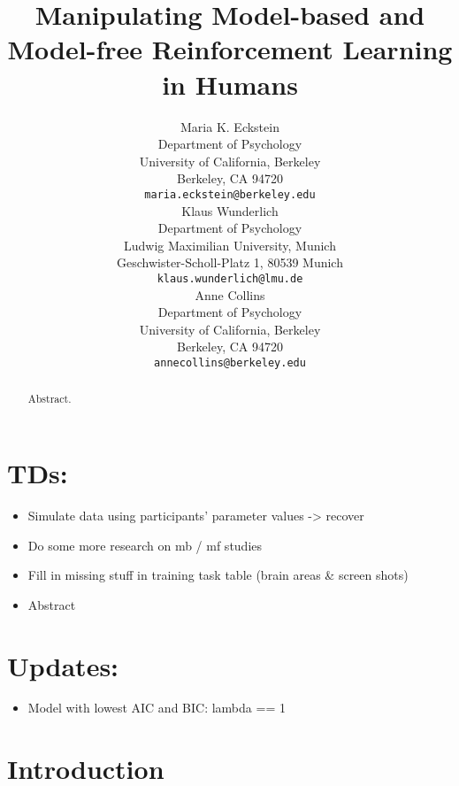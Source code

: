 \documentclass[11pt]{article} %
\title{Manipulating Model-based and Model-free Reinforcement Learning in Humans}
\author{
Maria K. Eckstein \\
Department of Psychology \\
University of California, Berkeley \\
Berkeley, CA 94720 \\
\texttt{maria.eckstein@berkeley.edu} \\
\And
Klaus Wunderlich \\
Department of Psychology \\
Ludwig Maximilian University, Munich \\
Geschwister-Scholl-Platz 1, 80539 Munich \\
\texttt{klaus.wunderlich@lmu.de} \\
\And
Anne Collins \\
Department of Psychology\\
University of California, Berkeley \\
Berkeley, CA 94720  \\
\texttt{annecollins@berkeley.edu} \\
}
\begin{document}
\maketitle

\begin{abstract}
Abstract. 
\end{abstract}




\section*{TDs:}
\begin{itemize}
	\item Simulate data using participants' parameter values -> recover
	\item Do some more research on mb / mf studies
	\item Fill in missing stuff in training task table (brain areas \& screen shots)
	\item Abstract
\end{itemize}

\section*{Updates:}
\begin{itemize}
	\item Model with lowest AIC and BIC: lambda == 1
\end{itemize}

\startmain %

\section{Introduction}
\end{document}
